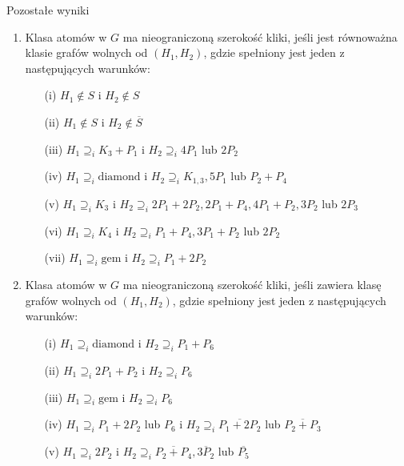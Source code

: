 \documentclass[polish]{beamer}
\begin{document}
\begin{frame}{Pozostałe wyniki}
    \begin{enumerate}
        \item Klasa atomów w $G$ ma nieograniczoną szerokość kliki, jeśli jest równoważna klasie grafów wolnych od $(H_1, H_2)$, gdzie spełniony jest jeden z następujących warunków:
        \begin{itemize}
            \item[(i)] $H_1 \notin S$ i $H_2 \notin S$
            \item[(ii)] $H_1 \notin S$ i $H_2 \notin \overline{S}$
            \item[(iii)] $H_1 \supseteq_i K_3 + P_1$ i $H_2 \supseteq_i 4P_1$ lub $2P_2$
            \item[(iv)] $H_1 \supseteq_i \text{diamond}$ i $H_2 \supseteq_i K_{1,3}, 5P_1$ lub $P_2 + P_4$
            \item[(v)] $H_1 \supseteq_i K_3$ i $H_2 \supseteq_i 2P_1 + 2P_2, 2P_1 + P_4, 4P_1 + P_2, 3P_2$ lub $2P_3$
            \item[(vi)] $H_1 \supseteq_i K_4$ i $H_2 \supseteq_i P_1 + P_4, 3P_1 + P_2$ lub $2P_2$
            \item[(vii)] $H_1 \supseteq_i \text{gem}$ i $H_2 \supseteq_i P_1 + 2P_2$
        \end{itemize}
        
        \item Klasa atomów w $G$ ma nieograniczoną szerokość kliki, jeśli zawiera klasę grafów wolnych od $(H_1, H_2)$, gdzie spełniony jest jeden z następujących warunków:
        \begin{itemize}
            \item[(i)] $H_1 \supseteq_i \text{diamond}$ i $H_2 \supseteq_i P_1 + P_6$
            \item[(ii)] $H_1 \supseteq_i 2P_1 + P_2$ i $H_2 \supseteq_i P_6$
            \item[(iii)] $H_1 \supseteq_i \text{gem}$ i $H_2 \supseteq_i P_6$
            \item[(iv)] $H_1 \supseteq_i P_1 + 2P_2$ lub $P_6$ i $H_2 \supseteq_i \overline{P_1 + 2P_2}$ lub $\overline{P_2 + P_3}$
            \item[(v)] $H_1 \supseteq_i 2P_2$ i $H_2 \supseteq_i \overline{P_2 + P_4}, \overline{3P_2}$ lub $\overline{P_5}$
        \end{itemize}
    \end{enumerate}
\end{frame}
\end{document}
